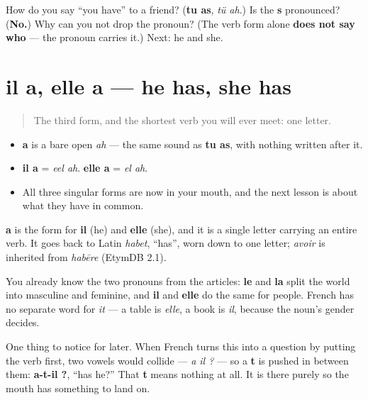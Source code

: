 \begin{tcolorbox}[breakable,colback=teal!4,colframe=teal!35!black,title={Before you move on}]
How do you say \textquotedblleft{}you have\textquotedblright{} to a friend? (\textbf{tu as}, \emph{tü ah}.) Is the \textbf{s} pronounced? (\textbf{No.}) Why can you not drop the pronoun? (The verb form alone \textbf{does not say who} — the pronoun carries it.) Next: he and she.
\end{tcolorbox}
\section[il a, elle a]{il a, elle a — he has, she has}

\label{lesson:FR-C14-a}



\begin{quote}
The third form, and the shortest verb you will ever meet: one letter.
\end{quote}

\begin{sounds}
\begin{itemize}
\raggedright
  \item \textbf{a} is a bare open \emph{ah} — the same sound as \textbf{tu as}, with nothing written after it.
  \item \textbf{il a} = \emph{eel ah}. \textbf{elle a} = \emph{el ah}.
  \item All three singular forms are now in your mouth, and the next lesson is about what they have in common.
\end{itemize}
\end{sounds}

\begin{cousinweb}
\textbf{a} is the form for \textbf{il} (he) and \textbf{elle} (she), and it is a single letter carrying an entire verb. It goes back to Latin \emph{habet}, \textquotedblleft{}has\textquotedblright{}, worn down to one letter; \emph{avoir} is inherited from \emph{habēre} (EtymDB 2.1).

You already know the two pronouns from the articles: \textbf{le} and \textbf{la} split the world into masculine and feminine, and \textbf{il} and \textbf{elle} do the same for people. French has no separate word for \emph{it} — a table is \emph{elle}, a book is \emph{il}, because the noun's gender decides.

One thing to notice for later. When French turns this into a question by putting the verb first, two vowels would collide — \emph{a il ?} — so a \textbf{t} is pushed in between them: \textbf{a-t-il ?}, \textquotedblleft{}has he?\textquotedblright{} That \textbf{t} means nothing at all. It is there purely so the mouth has something to land on.
\end{cousinweb}

